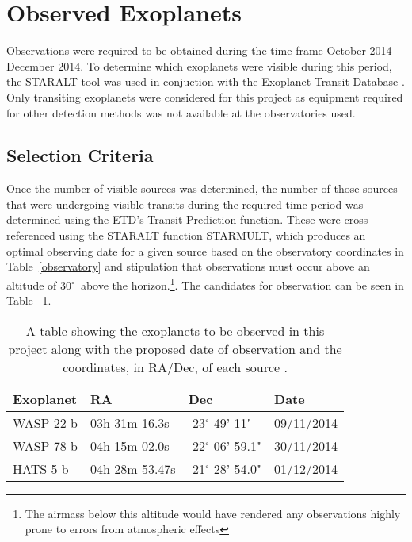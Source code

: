 \documentclass{report}
\begin{document}

\section{Observed Exoplanets}
Observations were required to be obtained during the time frame October 2014 - December 2014. To determine which exoplanets were visible during this period, the STARALT tool \parencite{staralt} was used in conjuction with the Exoplanet Transit Database \parencite{etd}. Only transiting exoplanets were considered for this project as equipment required for other detection methods was not available at the observatories used. 

\subsection{Selection Criteria}
Once the number of visible sources was determined, the number of those sources that were undergoing visible transits during the required time period was determined using the ETD's Transit Prediction function. These were cross-referenced using the STARALT function STARMULT, which produces an optimal observing date for a given source based on the observatory coordinates in Table~\ref{observatory} and stipulation that observations must occur above an altitude of 30$^\circ$\ above the horizon.\footnote{The airmass below this altitude would have rendered any observations highly prone to errors from atmospheric effects}. The candidates for observation can be seen in Table ~\ref{planets}.

\begin{table}[H]
    \centering
    \begin{tabular}{ | l | l | l | l | }
    \hline \hline
    Exoplanet & RA & Dec & Date       \\ \hline \hline
    WASP-22 b    & 03h 31m 16.3s & -23$^\circ$ 49' 11" & 09/11/2014 \\
    WASP-78 b   & 04h 15m 02.0s & -22$^\circ$ 06' 59.1" & 30/11/2014 \\
    HATS-5 b  & 04h 28m 53.47s & -21$^\circ$ 28' 54.0" & 01/12/2014 \\
    \hline
    \end{tabular}
    \caption{A table showing the exoplanets to be observed in this project along with the proposed date of observation and the coordinates, in RA/Dec, of each source \parencite{etd}.}
    \label{planets}
\end{table}
\end{document}
